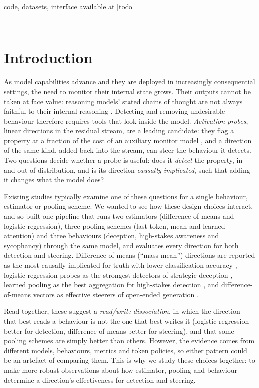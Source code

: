 code, datasets, interface available at [todo]







===========

\section{Introduction}

As model capabilities advance and they are deployed in increasingly
consequential settings, the need to monitor their internal state grows.
Their outputs cannot be taken at face value: reasoning models' stated
chains of thought are not always faithful to their internal reasoning
\citep{chen2025}. Detecting and removing undesirable behaviour therefore requires tools that look inside the model.
\emph{Activation probes}, linear directions in the residual stream, are a
leading candidate: they flag a property at a fraction of the cost of an
auxiliary monitor model \citep{alain2018,mckenzie2025}, and a direction of
the same kind, added back into the stream, can steer the behaviour it
detects. Two questions decide whether a probe is useful: does it
\emph{detect} the property, in and out of distribution, and is its
direction \emph{causally implicated}, such that adding it changes what the
model does?

Existing studies typically examine one of these questions for a single behaviour, estimator or pooling scheme. We
wanted to see how these design choices interact, and so built one pipeline
that runs two estimators (difference-of-means and logistic regression),
three pooling schemes (last token, mean and learned attention) and three
behaviours (deception, high-stakes awareness and sycophancy) through the
same model, and evaluates every direction for both detection and steering.
Difference-of-means (``mass-mean'')
directions are reported as the most causally implicated for truth with lower 
classification accuracy \citep{marks2024}, logistic-regression
probes as the strongest detectors of strategic deception
\citep{goldowsky2025}, learned pooling as the best aggregation for
high-stakes detection \citep{mckenzie2025}, and difference-of-means vectors as
effective steerers of open-ended generation \citep{rimsky2024}.

Read together, these suggest a \emph{read/write dissociation}, in which
the direction that best reads a behaviour is not the one that best writes
it (logistic regression better for detection, difference-of-means better
for steering), and that some pooling schemes are simply better than
others. However, the evidence comes from different models, behaviours,
metrics and token policies, so either pattern could be an artefact of
comparing them. This is why we study these choices together: to make more robust observations about how estimator, pooling and behaviour determine a direction's effectiveness for detection and steering.


